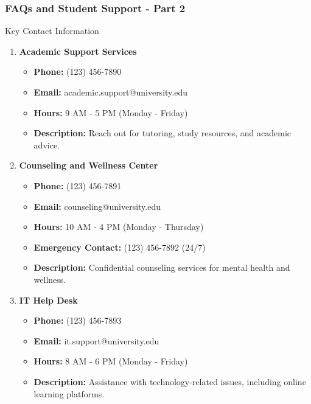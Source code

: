 \documentclass[aspectratio=169]{beamer}
\begin{document}
\begin{frame}[fragile]
    \frametitle{FAQs and Student Support - Part 2}
    \begin{block}{Key Contact Information}
        \begin{enumerate}
            \item \textbf{Academic Support Services}
            \begin{itemize}
                \item \textbf{Phone:} (123) 456-7890
                \item \textbf{Email:} academic.support@university.edu
                \item \textbf{Hours:} 9 AM - 5 PM (Monday - Friday)
                \item \textbf{Description:} Reach out for tutoring, study resources, and academic advice.
            \end{itemize}

            \item \textbf{Counseling and Wellness Center}
            \begin{itemize}
                \item \textbf{Phone:} (123) 456-7891
                \item \textbf{Email:} counseling@university.edu
                \item \textbf{Hours:} 10 AM - 4 PM (Monday - Thursday)
                \item \textbf{Emergency Contact:} (123) 456-7892 (24/7)
                \item \textbf{Description:} Confidential counseling services for mental health and wellness.
            \end{itemize}

            \item \textbf{IT Help Desk}
            \begin{itemize}
                \item \textbf{Phone:} (123) 456-7893
                \item \textbf{Email:} it.support@university.edu
                \item \textbf{Hours:} 8 AM - 6 PM (Monday - Friday)
                \item \textbf{Description:} Assistance with technology-related issues, including online learning platforms.
            \end{itemize}


\end{enumerate}
\end{block}
\end{frame}
\end{document}
